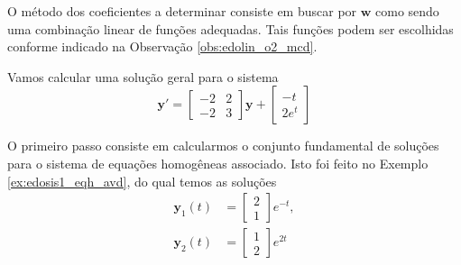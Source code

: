 O método dos coeficientes a determinar consiste em buscar por $\pmb{w}$ como sendo uma combinação linear de funções adequadas. Tais funções podem ser escolhidas conforme indicado na Observação \ref{obs:edolin_o2_mcd}.

\begin{ex}
  Vamos calcular uma solução geral para o sistema
  \begin{equation}\label{eq:ex_edosis1_eqnh}
    \pmb{y}' =
    \begin{bmatrix}
      -2 & 2 \\
      -2 & 3
    \end{bmatrix}\pmb{y} +
    \begin{bmatrix}
      -t \\
      2e^{t}
    \end{bmatrix}
  \end{equation}

  O primeiro passo consiste em calcularmos o conjunto fundamental de soluções para o sistema de equações homogêneas associado. Isto foi feito no Exemplo \ref{ex:edosis1_eqh_avd}, do qual temos as soluções
  \begin{align}
    \pmb{y}_1(t) &=
    \begin{bmatrix}
      2\\
      1
    \end{bmatrix}e^{-t},\\
    \pmb{y}_2(t) &=
    \begin{bmatrix}
      1\\
      2
    \end{bmatrix}e^{2t}
  \end{align}


\end{ex}
